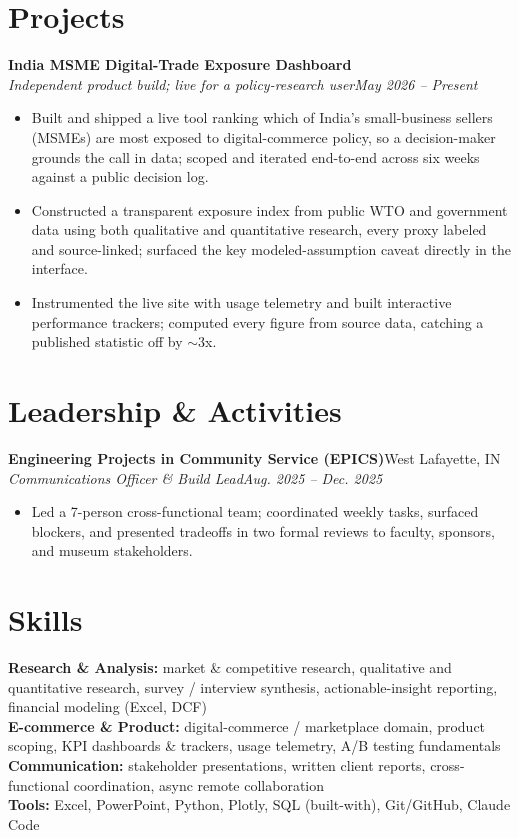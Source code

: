 \documentclass[10pt,letterpaper]{article}
\newcommand{\entry}[4]{%
  \textbf{#1}\hfill #2\\[1pt]
  \textit{#3}\hfill \textit{#4}\\[2pt]
}
\begin{document}
\section*{Projects}
\entry{India MSME Digital-Trade Exposure Dashboard}{}{Independent product build; live for a policy-research user}{May 2026 -- Present}
\begin{itemize}
  \item Built and shipped a live tool ranking which of India's small-business sellers (MSMEs) are most exposed to digital-commerce policy, so a decision-maker grounds the call in data; scoped and iterated end-to-end across six weeks against a public decision log.
  \item Constructed a transparent exposure index from public WTO and government data using both qualitative and quantitative research, every proxy labeled and source-linked; surfaced the key modeled-assumption caveat directly in the interface.
  \item Instrumented the live site with usage telemetry and built interactive performance trackers; computed every figure from source data, catching a published statistic off by $\sim$3x.
\end{itemize}

\section*{Leadership \& Activities}
\entry{Engineering Projects in Community Service (EPICS)}{West Lafayette, IN}{Communications Officer \& Build Lead}{Aug. 2025 -- Dec. 2025}
\begin{itemize}
  \item Led a 7-person cross-functional team; coordinated weekly tasks, surfaced blockers, and presented tradeoffs in two formal reviews to faculty, sponsors, and museum stakeholders.
\end{itemize}

\section*{Skills}
\textbf{Research \& Analysis:} market \& competitive research, qualitative and quantitative research, survey / interview synthesis, actionable-insight reporting, financial modeling (Excel, DCF)\\[2pt]
\textbf{E-commerce \& Product:} digital-commerce / marketplace domain, product scoping, KPI dashboards \& trackers, usage telemetry, A/B testing fundamentals\\[2pt]
\textbf{Communication:} stakeholder presentations, written client reports, cross-functional coordination, async remote collaboration\\[2pt]
\textbf{Tools:} Excel, PowerPoint, Python, Plotly, SQL (built-with), Git/GitHub, Claude Code
\end{document}
